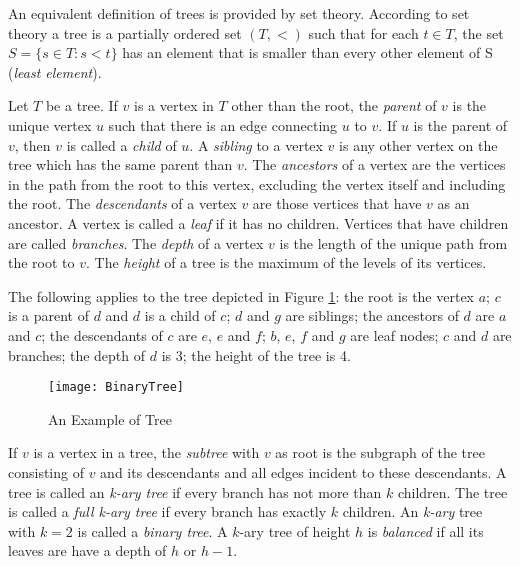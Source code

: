 \begin{example}
An equivalent definition of trees is provided by set theory. According to set theory a tree is a partially ordered set $(T, <)$ such that for each $t \in T$, the set $S = \{ s \in T : s < t \}$ has an element that is smaller than every other element of S (\emph{least element}).
\end{example}

Let $T$ be a tree. If $v$ is a vertex in $T$ other than the root, the \emph{parent} of $v$ is the unique vertex $u$ such that there is an edge connecting $u$ to $v$. If $u$ is the parent of $v$, then $v$ is called a \emph{child} of $u$. A \emph{sibling} to a vertex $v$ is any other vertex on the tree which has the same parent than $v$. The \emph{ancestors} of a vertex are the vertices in the path from the root to this vertex, excluding the vertex itself and including the root. The \emph{descendants} of a vertex $v$ are those vertices that have $v$ as an ancestor. A vertex is called a \emph{leaf} if it has no children. Vertices that have children are called \emph{branches}. The \emph{depth} of a vertex $v$ is the length of the unique path from the root to $v$. The \emph{height} of a tree is the maximum of the levels of its vertices. 

\begin{example}
The following applies to the tree depicted in Figure \ref{fig:BinaryTree-Example}: the root is the vertex $a$; $c$ is a parent of $d$ and $d$ is a child of $c$; $d$ and $g$ are siblings; the ancestors of $d$ are $a$ and $c$; the descendants of $c$ are $e$, $e$ and $f$; $b$, $e$, $f$ and $g$ are leaf nodes; $c$ and $d$ are branches; the depth of $d$ is 3; the height of the tree is 4.
\end{example}

\begin{figure}[h]
\centering\texttt{[image: BinaryTree]}
\caption{\label{fig:BinaryTree-Example}An Example of Tree}
\end{figure}

If $v$ is a vertex in a tree, the \emph{subtree} with $v$ as root is the subgraph of the tree consisting of $v$ and its descendants and all edges incident to these descendants. A tree is called an \emph{k-ary tree} if every branch has not more than $k$ children. The tree is called a \emph{full k-ary tree} if every branch has exactly $k$ children. An \emph{k-ary} tree with $k=2$ is called a \emph{binary tree}. A $k$-ary tree of height $h$ is \emph{balanced} if all its leaves are have a depth of $h$ or $h-1$.

